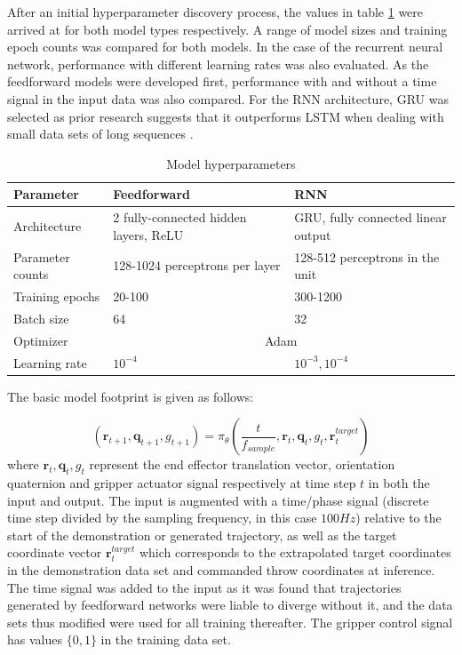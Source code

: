 \documentclass{article}
\begin{document}
After an initial hyperparameter discovery process, the values in table \ref{tab:table1} were arrived at for both model types respectively. A range of model sizes and training epoch counts was compared for both models. In the case of the recurrent neural network, performance with different learning rates was also evaluated. As the feedforward models were developed first, performance with and without a time signal in the input data was also compared. For the RNN architecture, GRU was selected as prior research suggests that it outperforms LSTM when dealing with small data sets of long sequences \citep{yang2020lstm}.

\begin{table}
	\caption{Model hyperparameters}
	\centering
	\begin{tabular}{lll}
		\toprule
		Parameter & Feedforward & RNN \\
		\midrule
		Architecture & 2 fully-connected hidden layers, ReLU  & GRU, fully connected linear output   \\
		Parameter counts     & 128-1024 perceptrons per layer & 128-512 perceptrons in the unit \\
		Training epochs     & 20-100       & 300-1200  \\
		Batch size    & 64       & 32  \\
		Optimizer    & \multicolumn{2}{c}{Adam}  \\
		Learning rate    & $10^{-4}$       & $10^{-3}, 10^{-4}$   \\
		\bottomrule
	\end{tabular}
	\label{tab:table1}
\end{table}

The basic model footprint is given as follows:

\begin{equation}
	(\boldsymbol{r}_{t+1}, \boldsymbol{q}_{t+1}, g_{t+1}) = \pi_{\theta}\left(\frac{t}{f_{sample}}, \boldsymbol{r}_{t}, \boldsymbol{q}_{t}, g_{t}, \boldsymbol{r}^{target}_t \right)
\end{equation}
where $\boldsymbol{r}_{t}, \boldsymbol{q}_{t}, g_{t}$ represent the end effector translation vector, orientation quaternion and gripper actuator signal respectively at time step $t$ in both the input and output. The input is augmented with a time/phase signal (discrete time step divided by the sampling frequency, in this case $100Hz$) relative to the start of the demonstration or generated trajectory, as well as the target coordinate vector $\boldsymbol{r}^{target}_t$ which corresponds to the extrapolated target coordinates in the demonstration data set and commanded throw coordinates at inference. The time signal was added to the input as it was found that trajectories generated by feedforward networks were liable to diverge without it, and the data sets thus modified were used for all training thereafter. The gripper control signal has values $\lbrace 0,1 \rbrace$ in the training data set.
\end{document}

